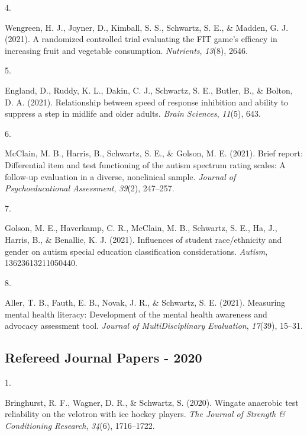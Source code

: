 \documentclass[11pt,a4paper,]{moderncv}
\newlength{\csllabelwidth}
\newcommand{\CSLLeftMargin}[1]{\parbox[t]{\csllabelwidth}{#1}}
\newcommand{\CSLRightInline}[1]{\parbox[t]{\linewidth - \csllabelwidth}{#1}}
\begin{document}
\leavevmode{}%
\CSLLeftMargin{4. }
\CSLRightInline{Wengreen, H. J., Joyner, D., Kimball, S. S., Schwartz,
S. E., \& Madden, G. J. (2021). A randomized controlled trial evaluating
the FIT game's efficacy in increasing fruit and vegetable consumption.
\emph{Nutrients}, \emph{13}(8), 2646.}

\leavevmode{}%
\CSLLeftMargin{5. }
\CSLRightInline{England, D., Ruddy, K. L., Dakin, C. J., Schwartz, S.
E., Butler, B., \& Bolton, D. A. (2021). Relationship between speed of
response inhibition and ability to suppress a step in midlife and older
adults. \emph{Brain Sciences}, \emph{11}(5), 643.}

\leavevmode{}%
\CSLLeftMargin{6. }
\CSLRightInline{McClain, M. B., Harris, B., Schwartz, S. E., \& Golson,
M. E. (2021). Brief report: Differential item and test functioning of
the autism spectrum rating scales: A follow-up evaluation in a diverse,
nonclinical sample. \emph{Journal of Psychoeducational Assessment},
\emph{39}(2), 247--257.}

\leavevmode{}%
\CSLLeftMargin{7. }
\CSLRightInline{Golson, M. E., Haverkamp, C. R., McClain, M. B.,
Schwartz, S. E., Ha, J., Harris, B., \& Benallie, K. J. (2021).
Influences of student race/ethnicity and gender on autism special
education classification considerations. \emph{Autism},
13623613211050440.}

\leavevmode{}%
\CSLLeftMargin{8. }
\CSLRightInline{Aller, T. B., Fauth, E. B., Novak, J. R., \& Schwartz,
S. E. (2021). Measuring mental health literacy: Development of the
mental health awareness and advocacy assessment tool. \emph{Journal of
MultiDisciplinary Evaluation}, \emph{17}(39), 15--31.}

\vspace{7mm}

\hypertarget{refereed-journal-papers---2020}{%
\subsection{\texorpdfstring{\textbf{Refereed Journal Papers -
2020}}{Refereed Journal Papers - 2020}}\label{refereed-journal-papers---2020}}

\hypertarget{refs_journals2020}{}
\leavevmode{}%
\CSLLeftMargin{1. }
\CSLRightInline{Bringhurst, R. F., Wagner, D. R., \& Schwartz, S.
(2020). Wingate anaerobic test reliability on the velotron with ice
hockey players. \emph{The Journal of Strength \& Conditioning Research},
\emph{34}(6), 1716--1722.}
\end{document}

